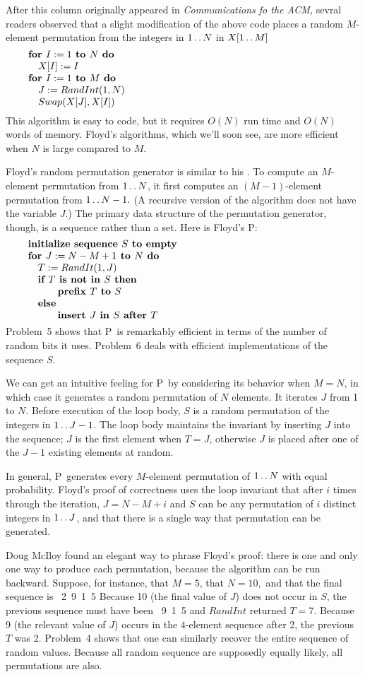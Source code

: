 After this column originally appeared in {\sl Communications fo the ACM,\/}
sevral readers observed that a slight modification of the above code places a
random $M$-element permutation from the integers in $1\mathinner{\ldotp\ldotp} N$ in
$X[1\mathinner{\ldotp\ldotp} M]$
$$\vbox{\let\par=\endgraf
\obeylines\sfcode`;=3000
{\bf for $I:=1$ to $N$ do}
\quad $X[I]:=I$
{\bf for $I:=1$ to $M$ do}
\quad $J:= RandInt(1, N)$
\quad $Swap(X[J], X[I])$
}$$
This algorithm is easy to code, but it requires $O(N)$ run time and $O(N)$ words
of memory. Floyd's algorithms, which we'll soon see, are more efficient when $N$
is large compared to $M$.

Floyd's random permutation generator is similar to his . To compute an
$M$-element permutation from $1\mathinner{\ldotp\ldotp} N$, it first computes an $(M-1)$-element
permutation from $1\mathinner{\ldotp\ldotp} N-1.$ (A recursive version of the algorithm does not
have the variable $J.$) The primary data structure of the permutation generator,
though, is a sequence rather than a set. Here is Floyd's \alg P:
$$\vbox{\let\par=\endgraf
\obeylines\sfcode`;=3000
{\bf initialize sequence $S$ to empty}
{\bf for $J:=N-M+1$ to $N$ do}
\quad $T:=RandIt(1,J)$
\quad {\bf if $T$ is not in $S$ then}
\qquad\quad {\bf prefix $T$ to $S$}
\quad {\bf else}
\qquad\quad {\bf insert $J$ in $S$ after $T$}
}$$
Problem~5 shows that \alg P\ is remarkably efficient in terms of the number of
random bits it uses. Problem~6 deals with efficient implementations of the
sequence $S.$

We can get an intuitive feeling for \alg P\ by considering its behavior when
$M=N$, in which case it generates a random permutation of $N$ elements. It
iterates $J$ from 1 to $N$. Before execution of the loop body, $S$ is a
random permutation of the integers in $1\mathinner{\ldotp\ldotp} J-1$. The loop body maintains
the invariant by inserting $J$ into the sequence; $J$ is the first element
when $T=J$, otherwise $J$ is placed after one of the $J-1$ existing elements
at random.

In general, \alg P\ generates every $M$-element permutation of $1\mathinner{\ldotp\ldotp} N$
with equal probability. Floyd's proof of correctness uses the loop invariant
that after $i$ times through the iteration, $J=N-M+i$ and $S$ can be any
permutation of $i$ distinct integers in $1\mathinner{\ldotp\ldotp} J$, and that there is a
single way that permutation can be generated.

Doug McIloy found an elegant way to phrase Floyd's proof: there is one and
only one way to produce each permutation, because the algorithm can be run
backward. Suppose, for instance, that $M=5$, that $N=10,$ and that the final
sequence is
\ 2\ 9\ 1\ 5
\enddisplay
Because 10 (the final value of $J$) does not occur in $S$, the previous
sequence must have been
\ 9\ 1\ 5
\enddisplay
and $RandInt$ returned $T=7.$ Because 9 (the relevant value of $J$) occurs
in the $4$-element sequence after 2, the previous $T$ was 2. Problem~4 shows
that one can similarly recover the entire sequence of random values. Because
all random sequence are supposedly equally likely, all permutations are also.

